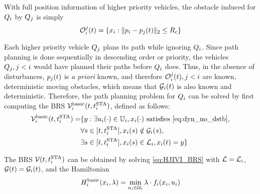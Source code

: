 With full position information of higher priority vehicles, the obstacle induced for $Q_i$ by $Q_j$ is simply
\begin{equation}
\label{eq:ioset_basic}
\ioset_i^j(t) = \{\state_i: \|\pos_i - \pos_j(t)\|_2 \le \rc \}
\end{equation}

Each higher priority vehicle $Q_j$ plans its path while ignoring $Q_i$. Since path planning is done sequentially in descending order or priority, the vehicles $Q_j, j<i$ would have planned their paths before $Q_i$ does. Thus, in the absence of disturbances, $p_j(t)$ is \textit{a priori} known, and therefore $\mathcal{O}_i^j(t), j<i$ are known, deterministic moving obstacles, which means that $\mathcal{G}_i(t)$ is also known and deterministic. Therefore, the path planning problem for $Q_i$ can be solved by first computing the BRS $\mathcal{V}_i^\text{basic}(t, t^\text{STA}_i)$, defined as follows:
\begin{equation}
\label{eq:BRS_basic}
\begin{aligned}
\brs_i^\text{basic}(t, \sta_i) = & \{y: \exists \ctrl_i(\cdot) \in \cfset_i, \state_i(\cdot) \text{ satisfies \eqref{eq:dyn_no_dstb}}, \\
& \forall s \in [t, \sta_i],\state_i(s) \notin \obsset_i(s), \\
& \exists s \in [t, \sta_i], \state_i(s) \in \targetset_i, \state_i(t) = y\}
\end{aligned}
\end{equation}

The BRS $\mathcal{V}(t, t^\text{STA}_i)$ can be obtained by solving \eqref{eq:HJIVI_BRS} with $\mathcal{L} = \mathcal{L}_i$, $\mathcal{G}(t) = \mathcal{G}_i(t)$, and the Hamiltonian 
\begin{equation}
\label{eq:basicham}
\ham_i^\text{basic}(\state_i, \costate) = \min_{\ctrl_i\in\cset_i} \costate \cdot \fdyn_i(\state_i, \ctrl_i)
\end{equation}

